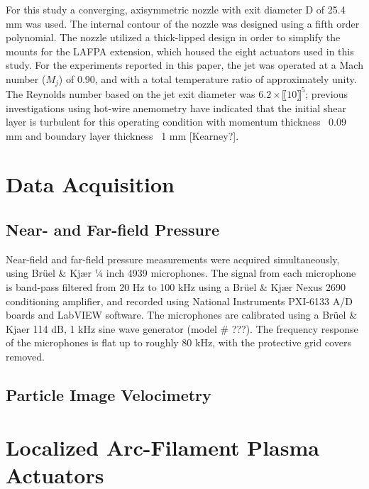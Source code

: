 For this study a converging, axisymmetric nozzle with exit diameter D of 25.4 mm was used. 
The internal contour of the nozzle was designed using a fifth order polynomial. 
The nozzle utilized a thick-lipped design in order to simplify the mounts for the LAFPA extension, which housed the eight actuators used in this study. 
For the experiments reported in this paper, the jet was operated at a Mach number ($M_j$) of 0.90, and with a total temperature ratio of approximately unity. 
The Reynolds number based on the jet exit diameter was $6.2 \times〖10〗^5$; previous investigations using hot-wire anemometry have indicated that the initial shear layer is turbulent for this operating condition with momentum thickness ~0.09 mm and boundary layer thickness ~1 mm [Kearney?].

\section{Data Acquisition}
\subsection{Near- and Far-field Pressure}
Near-field and far-field pressure measurements were acquired simultaneously, using Brüel \& Kjær ¼ inch 4939 microphones. 
The signal from each microphone is band-pass filtered from 20 Hz to 100 kHz using a Brüel \& Kjær Nexus 2690 conditioning amplifier, and recorded using National Instruments PXI-6133 A/D boards and LabVIEW software. 
The microphones are calibrated using a Brüel \& Kjaer 114 dB, 1 kHz sine wave generator (model \# ???). 
The frequency response of the microphones is flat up to roughly 80 kHz, with the protective grid covers removed. 

\subsection{Particle Image Velocimetry}

\section{Localized Arc-Filament Plasma Actuators}